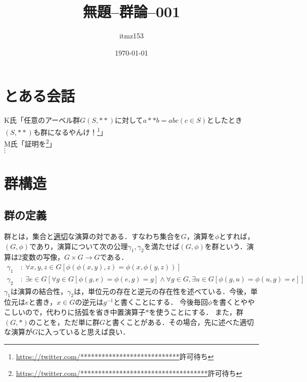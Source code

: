 \documentclass[dvipdfmx,12pt]{jsarticle}
\title{無題--群論--001}
\author{itmz153}
\date{\today}
\begin{document}
\maketitle
\section*{とある会話}
K氏「任意のアーベル群$G(S, **)$に対して$a ** b = abc (c∈S)$としたとき$(S, **)$も群になるやんけ！\footnote{\url{https://twitter.com/****************************}許可待ち}」 \\

M氏「証明を\footnote{\url{https://twitter.com/************************************}許可待ち}」 \\

$\vdots$
\section*{群構造}
\subsection*{群の定義}
群とは，集合と\underline{適切}な演算の対である．すなわち集合を$G$，演算を$\phi$とすれば，$(G,\phi)$であり，演算について次の公理$\gamma_1 , \gamma_2$を満たせば$(G,\phi)$を群という．演算は2変数の写像，$G \times G \to G$である．
\begin{align*}
\gamma_1\ &:\ \forall x,y,z \in G[\phi(\phi(x,y),z) = \phi(x,\phi(y,z))] \\
\gamma_2\ &: \ \exists e \in G [\forall g \in G[\phi(g,e) = \phi(e,g) = g] \land \forall g \in G , \exists u \in G[\phi(g,u) = \phi(u,g) = e]]
\end{align*}
$\gamma_1$は演算の結合性，$\gamma_2$は，単位元の存在と逆元の存在性を述べている．今後，単位元は$e$と書き，$x \in G$の逆元は$g^{-1}$と書くことにする．
今後毎回$\phi$を書くとややこしいので，代わりに括弧を省き中置演算子$*$を使うことにする．
また，群$(G,*)$のことを，ただ単に群$G$と書くことがある．その場合，先に述べた適切な演算が$G$に入っていると思えば良い．
\end{document}
